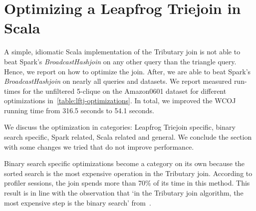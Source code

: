 \section{Optimizing a Leapfrog Triejoin in Scala}\label{sec:lftj-optimizations}

A simple, idiomatic Scala implementation of the Tributary join is not able to beat Spark's \textit{BroadcastHashjoin}
on any other query than the triangle query.
Hence, we report on how to optimize the join.
After, we are able to beat Spark's \textit{BroadcastHashjoin} on nearly all queries and datasets.
We report measured run-times for the unfiltered 5-clique on the Amazon0601 dataset for different optimizations
in~\cref{table:lftj-optimizations}.
In total, we improved the WCOJ running time from 316.5 seconds to 54.1 seconds.

We discuss the optimization in categories: Leapfrog Triejoin specific, binary search specific, Spark related, Scala related and general.
We conclude the section with some changes we tried that do not improve performance.

Binary search specific optimizations become a category on its own because the sorted search is the most expensive operation in the Tributary join.
According to profiler sessions, the join spends more than 70\% of its time in this method.
This result is in line with the observation that `in the Tributary join algorithm, the most expensive step is the binary search' from~\cite{myria-detailed}.

